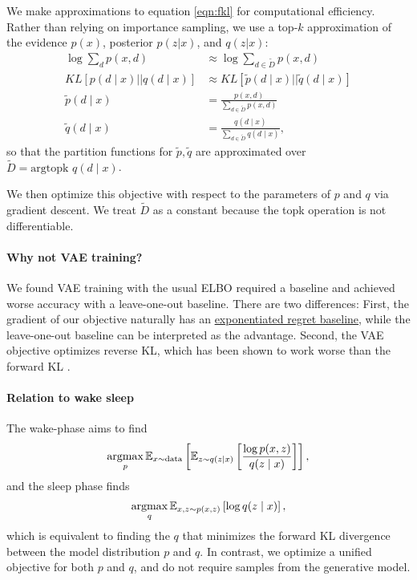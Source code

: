 \documentclass[11pt]{article}
\begin{document}
We make approximations to equation \ref{eqn:fkl} for computational efficiency.
Rather than relying on importance sampling, we use a top-$k$ approximation
of the evidence $p(x)$, posterior $p(z|x)$, and $q(z|x)$:
\begin{align*}
\log\sum_d p(x,d) &\approx \log\sum_{d\in \tilde{D}} p(x,d)\\
KL[p(d\mid x) || q(d \mid x)] &\approx KL[\tilde{p}(d\mid x) || \tilde{q}(d \mid x)]\\
\tilde{p}(d\mid x) &= \frac{p(x,d)}{\sum_{d \in \tilde{D}} p(x,d)}\\
\tilde{q}(d\mid x) &= \frac{q(d\mid x)}{\sum_{d \in \tilde{D}} q(d\mid x)},
\end{align*}
so that the partition functions for $\tilde{p},\tilde{q}$ are approximated over
$\tilde{D} = \text{argtopk } q(d\mid x)$.

We then optimize this objective with respect to the parameters of $p$ and $q$ 
via gradient descent. We treat $\tilde{D}$ as a constant because the topk operation
is not differentiable.

\paragraph{Why not VAE training?} We found VAE training with the usual ELBO
required a baseline and achieved worse accuracy with a leave-one-out baseline.
There are two differences:
First, the gradient of our objective naturally has an
\href{https://github.com/justinchiu/elbos-baselines}{exponentiated regret baseline},
while the leave-one-out baseline can be interpreted as the advantage.
Second, the VAE objective optimizes reverse KL, which has
been shown to work worse than the forward KL \cite{fkl}.

\paragraph{Relation to wake sleep} The wake-phase aims to find
\begin{equation}
\operatorname*{argmax}_p \mathbb{E}_{x\sim \text{data}}\left[\mathbb{E}_{z\sim q(z\mid x)}\left[\frac{\log p(x,z)}{q(z\mid x)}\right]\right],
\end{equation}
and the sleep phase finds
\begin{equation}
\operatorname*{argmax}_q \mathbb{E}_{x,z\sim p(x,z)}\left[\log q(z\mid x)\right],
\end{equation}
which is equivalent to finding the $q$ that minimizes the forward KL divergence
between the model distribution $p$ and $q$.
In contrast, we optimize a unified objective for both $p$ and $q$,
and do not require samples from the generative model.
\end{document}
